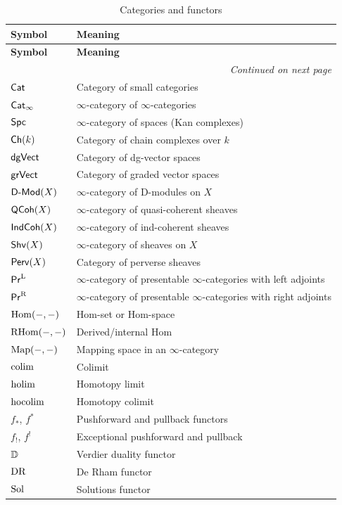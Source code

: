 \begin{longtable}{p{3cm} p{10cm}}
\caption{Categories and functors} \\
\toprule
\textbf{Symbol} & \textbf{Meaning} \\
\midrule
\endfirsthead
\toprule
\textbf{Symbol} & \textbf{Meaning} \\
\midrule
\endhead
\midrule
\multicolumn{2}{r}{\textit{Continued on next page}} \\
\endfoot
\bottomrule
\endlastfoot

$\mathsf{Cat}$ & Category of small categories \\
$\mathsf{Cat}_\infty$ & $\infty$-category of $\infty$-categories \\
$\mathsf{Spc}$ & $\infty$-category of spaces (Kan complexes) \\
$\mathsf{Ch}(k)$ & Category of chain complexes over $k$ \\
$\mathsf{dgVect}$ & Category of dg-vector spaces \\
$\mathsf{grVect}$ & Category of graded vector spaces \\
$\mathsf{D}\text{-}\mathsf{Mod}(X)$ & $\infty$-category of D-modules on $X$ \\
$\mathsf{QCoh}(X)$ & $\infty$-category of quasi-coherent sheaves \\
$\mathsf{IndCoh}(X)$ & $\infty$-category of ind-coherent sheaves \\
$\mathsf{Shv}(X)$ & $\infty$-category of sheaves on $X$ \\
$\mathsf{Perv}(X)$ & Category of perverse sheaves \\
$\mathsf{Pr}^\mathrm{L}$ & $\infty$-category of presentable $\infty$-categories with left adjoints \\
$\mathsf{Pr}^\mathrm{R}$ & $\infty$-category of presentable $\infty$-categories with right adjoints \\
$\operatorname{Hom}(-, -)$ & Hom-set or Hom-space \\
$\operatorname{RHom}(-, -)$ & Derived/internal Hom \\
$\operatorname{Map}(-, -)$ & Mapping space in an $\infty$-category \\
$\operatorname{colim}$ & Colimit \\
$\operatorname{holim}$ & Homotopy limit \\
$\operatorname{hocolim}$ & Homotopy colimit \\
$f_*$, $f^*$ & Pushforward and pullback functors \\
$f_!$, $f^!$ & Exceptional pushforward and pullback \\
$\mathbb{D}$ & Verdier duality functor \\
$\mathrm{DR}$ & De Rham functor \\
$\mathrm{Sol}$ & Solutions functor \\
\end{longtable}


